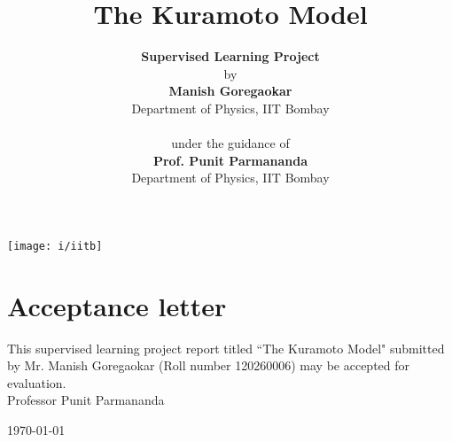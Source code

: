 \documentclass[12pt]{article}
\begin{document}
\title{The Kuramoto Model}
\author{{\bf Supervised Learning Project}\\by\\ {\bf Manish Goregaokar}\\Department of Physics, IIT Bombay\\\quad\\under the guidance of\\{\bf Prof. Punit Parmananda}\\Department of Physics, IIT Bombay }

\maketitle
\begin{center}
\texttt{[image: i/iitb]}
\end{center}

\pagebreak
{}
\section*{Acceptance letter}
This supervised learning project report titled ``The Kuramoto Model" submitted by Mr. Manish Goregaokar (Roll number 120260006) may be accepted for evaluation.\\

\hfill Professor Punit Parmananda

\hfill \today
\pagebreak
{}
\end{document}
